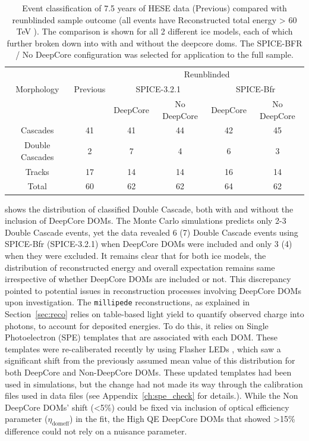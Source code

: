 \begin{table}[h]
    \caption[Event classification of 7.5 years of HESE data, compared with reanalysis done using different ice models and inclusion/exclusion of DeepCore DOMs in the analysis]{Event classification of 7.5 years of HESE data (Previous) compared with reunblinded sample outcome (all events have Reconstructed total energy > 60 TeV ). The comparison is shown for all 2 different ice models, each of which further broken down into with and without the deepcore doms. The SPICE-BFR / No DeepCore configuration was selected for application to the full sample.}
    \raggedright
    \begin{tabular}{ c|c|c c |cc}
        \toprule
            & & \multicolumn{4}{c}{Reunblinded}\\
            
           Morphology&Previous & \multicolumn{2}{c|}{SPICE-3.2.1} & \multicolumn{2}{c}{SPICE-Bfr}\\
           
                     &   & DeepCore & No DeepCore & DeepCore & No DeepCore\\
                                
        \hline
        Cascades & 41 & 41 & 44 &42&45 \\
        Double Cascades & 2 & 7 &4&6& 3 \\
        Tracks& 17&14&14&16&14\\
        \hline
        Total & 60 & 62 &62&64&62\\
        \bottomrule
\end{tabular}
\end{table}
 shows the distribution of classified Double Cascade, both with and without the inclusion of DeepCore DOMs. The Monte Carlo simulations predicts only 2-3 Double Cascade events, yet the data revealed 6 (7) Double Cascade events using SPICE-Bfr (SPICE-3.2.1) when DeepCore DOMs were included and only 3 (4) when they were excluded. It remains clear that for both ice models, the distribution of reconstructed energy and overall expectation remains same irrespective of whether DeepCore DOMs are included or not. This discrepancy pointed to potential issues in reconstruction processes involving DeepCore DOMs upon investigation. The \texttt{millipede} reconstructions, as explained in Section~\ref{sec:reco} relies on table-based light yield to quantify observed charge into photons, to account for deposited energies. To do this, it relies on Single Photoelectron (SPE) templates that are associated with each DOM. These templates were re-caliberated recently by using Flasher LEDs , which saw a significant shift from the previously assumed mean value of this distribution for both DeepCore and Non-DeepCore DOMs. These updated templates had been used in simulations, but the change had not made its way through the calibration files used in data files (see Appendix~\ref{ch:spe_check} for details.). While the Non DeepCore DOMs' shift (<5\%) could be fixed via inclusion of optical efficiency parameter ($\eta_{\mathrm{domeff}}$) in the fit, the High QE DeepCore DOMs that showed >15\% difference could not rely on a nuisance parameter.  

